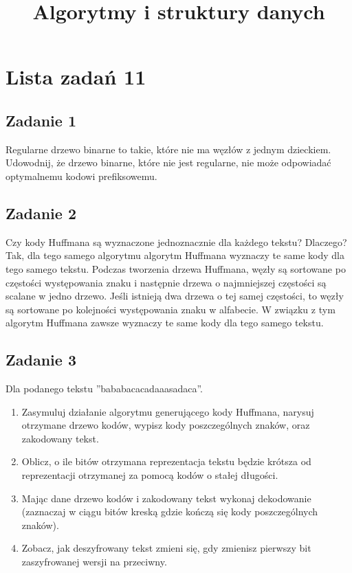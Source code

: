 \documentclass{article}
\begin{document}
\title{Algorytmy i struktury danych}
\author{}
\date{}
\maketitle

\section*{Lista zadań 11}

\subsection*{Zadanie 1}
Regularne drzewo binarne to takie, które nie ma węzłów z jednym dzieckiem. Udowodnij, że drzewo
binarne, które nie jest regularne, nie może odpowiadać optymalnemu kodowi prefiksowemu.

\subsection*{Zadanie 2}
Czy kody Huffmana są wyznaczone jednoznacznie dla każdego tekstu? Dlaczego?
\noindent \\[1em]
Tak, dla tego samego algorytmu algorytm Huffmana wyznaczy te same kody dla tego samego tekstu.
Podczas tworzenia drzewa Huffmana, węzły są sortowane po częstości występowania znaku i następnie
drzewa o najmniejszej częstości są scalane w jedno drzewo. Jeśli istnieją dwa drzewa o tej samej
częstości, to węzły są sortowane po kolejności występowania znaku w alfabecie. W związku z tym
algorytm Huffmana zawsze wyznaczy te same kody dla tego samego tekstu.

\subsection*{Zadanie 3}
Dla podanego tekstu ”bababacacadaaasadaca”.
\begin{enumerate}[label=(\alph*)]
    \item Zasymuluj działanie algorytmu generującego kody Huffmana, narysuj otrzymane
          drzewo kodów, wypisz kody poszczególnych znaków, oraz zakodowany tekst.
    \item Oblicz, o ile bitów otrzymana reprezentacja tekstu będzie krótsza od reprezentacji
          otrzymanej za pomocą kodów o stałej długości.
    \item Mając dane drzewo kodów i zakodowany tekst wykonaj dekodowanie (zaznaczaj w
          ciągu bitów kreską gdzie kończą się kody poszczególnych znaków).
    \item Zobacz, jak deszyfrowany tekst zmieni się, gdy zmienisz pierwszy bit zaszyfrowanej
          wersji na przeciwny.
\end{enumerate}
\end{document}
